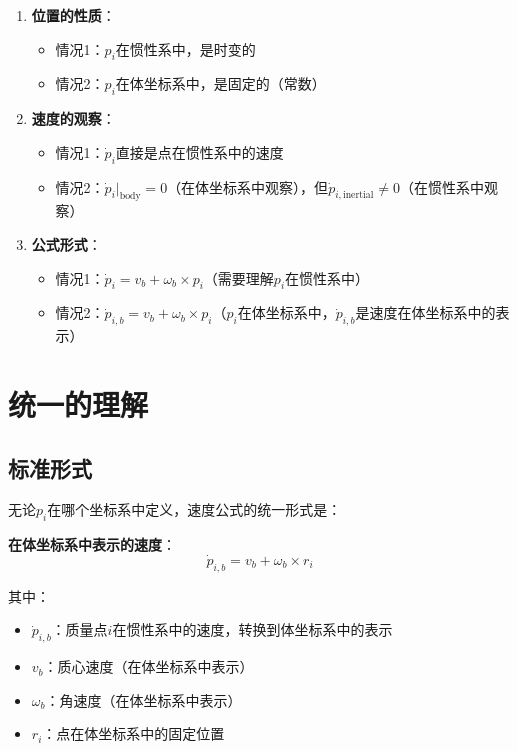 \documentclass[12pt,a4paper]{article}
\begin{document}
\begin{enumerate}
\item \textbf{位置的性质}：
\begin{itemize}
\item 情况1：$p_i$在惯性系中，是时变的
\item 情况2：$p_i$在体坐标系中，是固定的（常数）
\end{itemize}

\item \textbf{速度的观察}：
\begin{itemize}
\item 情况1：$\dot{p}_i$直接是点在惯性系中的速度
\item 情况2：$\dot{p}_i\Big|_{\text{body}} = 0$（在体坐标系中观察），但$\dot{p}_{i,\text{inertial}} \neq 0$（在惯性系中观察）
\end{itemize}

\item \textbf{公式形式}：
\begin{itemize}
\item 情况1：$\dot{p}_i = v_b + \omega_b \times p_i$（需要理解$p_i$在惯性系中）
\item 情况2：$\dot{p}_{i,b} = v_b + \omega_b \times p_i$（$p_i$在体坐标系中，$\dot{p}_{i,b}$是速度在体坐标系中的表示）
\end{itemize}
\end{enumerate}

\section{统一的理解}

\subsection{标准形式}

无论$p_i$在哪个坐标系中定义，速度公式的统一形式是：

\textbf{在体坐标系中表示的速度}：
\begin{equation}
\dot{p}_{i,b} = v_b + \omega_b \times r_i
\label{eq:unified_velocity}
\end{equation}

其中：
\begin{itemize}
\item $\dot{p}_{i,b}$：质量点$i$在惯性系中的速度，转换到体坐标系中的表示
\item $v_b$：质心速度（在体坐标系中表示）
\item $\omega_b$：角速度（在体坐标系中表示）
\item $r_i$：点在体坐标系中的固定位置
\end{itemize}
\end{document}

